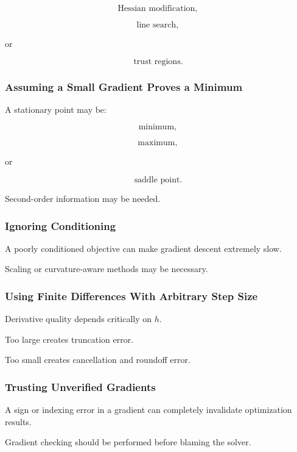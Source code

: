\[
\boxed{
\text{Hessian modification},
}
\]

\[
\boxed{
\text{line search},
}
\]

or

\[
\boxed{
\text{trust regions}.
}
\]

\subsubsection{Assuming a Small Gradient Proves a Minimum}

A stationary point may be:

\[
\boxed{
\text{minimum},
}
\]

\[
\boxed{
\text{maximum},
}
\]

or

\[
\boxed{
\text{saddle point}.
}
\]

Second-order information may be needed.

\subsubsection{Ignoring Conditioning}

A poorly conditioned objective can make gradient descent extremely slow.

Scaling or curvature-aware methods may be necessary.

\subsubsection{Using Finite Differences With Arbitrary Step Size}

Derivative quality depends critically on \(h\).

Too large creates truncation error.

Too small creates cancellation and roundoff error.

\subsubsection{Trusting Unverified Gradients}

A sign or indexing error in a gradient can completely invalidate
optimization results.

Gradient checking should be performed before blaming the solver.

